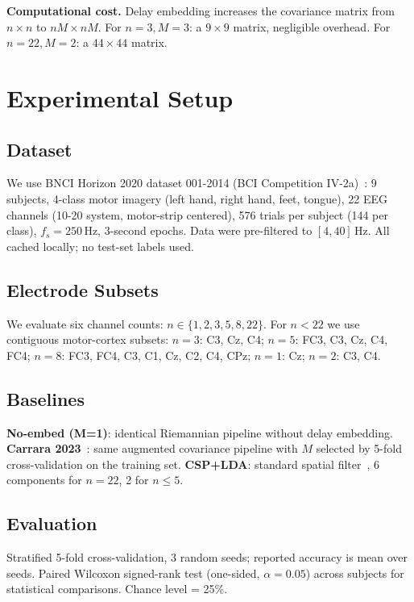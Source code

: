 \documentclass[journal]{IEEEtran}
\begin{document}
\textbf{Computational cost.} Delay embedding increases the covariance matrix from $n \times n$ to $nM \times nM$. For $n=3, M=3$: a $9 \times 9$ matrix, negligible overhead. For $n=22, M=2$: a $44 \times 44$ matrix.

\section{Experimental Setup}
\label{sec:experiments}

\subsection{Dataset}
We use BNCI Horizon 2020 dataset 001-2014 (BCI Competition IV-2a)~\cite{tangermann2012}: 9 subjects, 4-class motor imagery (left hand, right hand, feet, tongue), 22 EEG channels (10-20 system, motor-strip centered), 576 trials per subject (144 per class), $f_s = 250$\,Hz, $3$-second epochs. Data were pre-filtered to $[4, 40]$\,Hz. All cached locally; no test-set labels used.

\subsection{Electrode Subsets}
We evaluate six channel counts: $n \in \{1, 2, 3, 5, 8, 22\}$. For $n < 22$ we use contiguous motor-cortex subsets: $n=3$: C3, Cz, C4; $n=5$: FC3, C3, Cz, C4, FC4; $n=8$: FC3, FC4, C3, C1, Cz, C2, C4, CPz; $n=1$: Cz; $n=2$: C3, C4.

\subsection{Baselines}
\textbf{No-embed (M=1)}: identical Riemannian pipeline without delay embedding. \textbf{Carrara 2023}~\cite{carrara2023}: same augmented covariance pipeline with $M$ selected by 5-fold cross-validation on the training set. \textbf{CSP+LDA}: standard spatial filter~\cite{blankertz2007}, 6 components for $n=22$, 2 for $n \leq 5$.

\subsection{Evaluation}
Stratified 5-fold cross-validation, 3 random seeds; reported accuracy is mean over seeds. Paired Wilcoxon signed-rank test (one-sided, $\alpha = 0.05$) across subjects for statistical comparisons. Chance level = 25\%.
\end{document}
